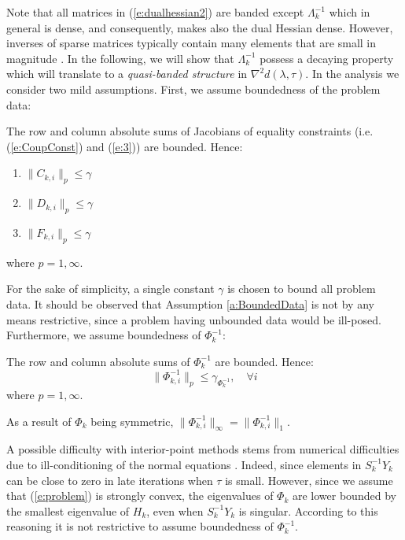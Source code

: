 Note that all matrices in (\ref{e:dualhessian2}) are banded except $\Lambda_k^{-1}$ which in general is dense, and consequently, makes also the dual Hessian dense. However, inverses of sparse matrices typically contain many elements that are small in magnitude \cite{Benzi2002}. In the following, we will show that $\Lambda_k^{-1}$ possess a decaying property which will translate to a \emph{quasi-banded structure} in $\nabla^2 d(\lambda,\tau)$. In the analysis we consider two mild assumptions. First, we assume boundedness of the problem data:
\begin{assumption} \label{a:BoundedData}
The row and column absolute sums of Jacobians of equality constraints (i.e. (\ref{e:CoupConst}) and (\ref{e:3})) are bounded. Hence:
\begin{enumerate}
\item $\| C_{k,i} \|_p \leq \gamma$
\item $\| D_{k,i} \|_p \leq \gamma$
\item $\| F_{k,i} \|_p \leq \gamma$
\end{enumerate}
where $p=1, \infty$.
\end{assumption}
For the sake of simplicity, a single constant $\gamma$ is chosen to bound all problem data. It should be observed that Assumption \ref{a:BoundedData} is not by any means restrictive, since a problem having unbounded data would be ill-posed. Furthermore, we assume boundedness of $\Phi_k^{-1}$:
\begin{assumption} \label{a:BoundedConditioning}
The row and column absolute sums of $\Phi_k^{-1}$ are bounded. Hence:
\begin{equation}
\| \Phi_{k,i}^{-1} \|_p \leq \gamma_{\Phi_k^{-1}}, \quad \forall i
\end{equation}
where $p=1,\infty$.
\end{assumption}
\begin{remark}
As a result of $\Phi_k$ being symmetric, $\| \Phi_{k,i}^{-1} \|_\infty = \| \Phi_{k,i}^{-1} \|_1$.
\end{remark}

A possible difficulty with interior-point methods stems from numerical difficulties due to ill-conditioning of the normal equations \cite{WrightM1998}. Indeed, since elements in $S_k^{-1}Y_k$ can be close to zero in late iterations when $\tau$ is small. However, since we assume that (\ref{e:problem}) is strongly convex, the eigenvalues of $\Phi_k$ are lower bounded by the smallest eigenvalue of $H_k$, even when $S_k^{-1}Y_k$ is singular. According to this reasoning it is not restrictive to assume boundedness of $\Phi_k^{-1}$.

